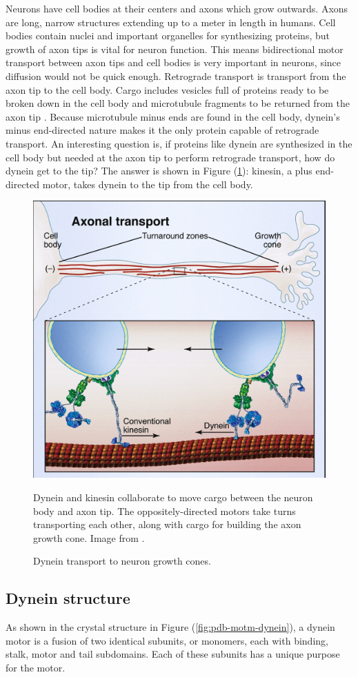\documentclass[
11pt, %
english, %
singlespacing, %
headsepline, %
chapterinoneline, %
]{MastersDoctoralThesis} %
\begin{document}
Neurons have cell bodies at their centers and axons which grow outwards. Axons are long, narrow structures extending up to a meter in length in humans. Cell bodies contain nuclei and important organelles for synthesizing proteins, but growth of axon tips is vital for neuron function. This means bidirectional motor transport between axon tips and cell bodies is very important in neurons, since diffusion would not be quick enough. Retrograde transport is transport from the axon tip to the cell body. Cargo includes vesicles full of proteins ready to be broken down in the cell body and microtubule fragments to be returned from the axon tip \cite{neuroanatomy}. Because microtubule minus ends are found in the cell body, dynein's minus end-directed nature makes it the only protein capable of retrograde transport. An interesting question is, if proteins like dynein are synthesized in the cell body but needed at the axon tip to perform retrograde transport, how do dynein get to the tip? The answer is shown in Figure (\ref{retrograde-transport}): kinesin, a plus end-directed motor, takes dynein to the tip from the cell body.\\

\begin{figure}[h]
  \centering
  \includegraphics[width=.65\textwidth,keepaspectratio]{../figures/retrograde_transport.jpg}
  \caption{Dynein transport to neuron growth cones.}{Dynein and kinesin collaborate to move cargo between the neuron body and axon tip. The oppositely-directed motors take turns transporting each other, along with cargo for building the axon growth cone. Image from \cite{valetoolbox}.}
  \label{retrograde-transport}
\end{figure}

\subsection{Dynein structure}
As shown in the crystal structure in Figure (\ref{fig:pdb-motm-dynein}), a dynein motor is a fusion of two identical subunits, or monomers, each with binding, stalk, motor and tail subdomains. Each of these subunits has a unique purpose for the motor.\\
\end{document}
